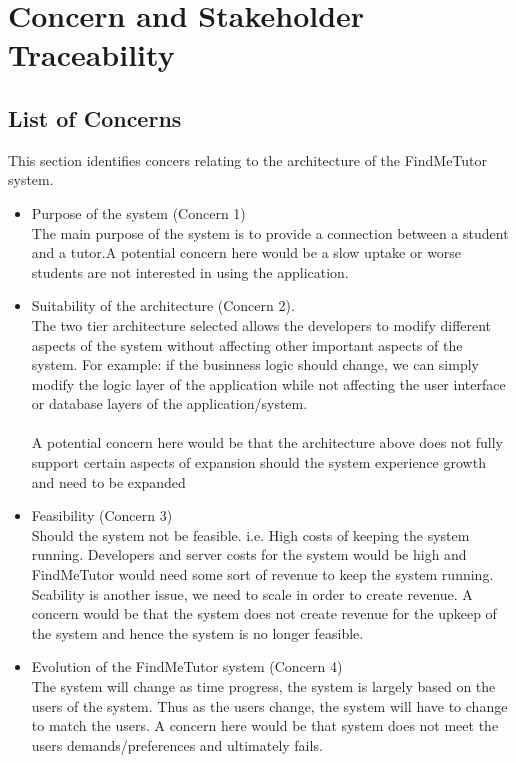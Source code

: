 \documentclass[12pt]{article}
\begin{document}
\pagebreak

\section{Concern and Stakeholder Traceability}
\subsection{List of Concerns}
This section identifies concers relating to the architecture of the FindMeTutor system.
\begin{itemize}
\item{Purpose of the system (Concern 1)}\\
The main purpose of the system is to provide a connection between a student and a tutor.A potential concern here would be a slow uptake or worse students are not interested in using the application.

\item Suitability of the architecture (Concern 2).\\
The two tier architecture selected allows the developers to modify different aspects of the system without affecting other important aspects of the system. For example: if the businness logic should change, we can simply modify the logic layer of the application while not affecting the user interface or database layers of the application/system.\\\\A potential concern here would be that the architecture above does not fully support certain aspects of expansion should the system experience growth and need to be expanded

\item Feasibility (Concern 3)\\
Should the system not be feasible. i.e. High costs of keeping the system running. Developers and server costs for the system would be high and FindMeTutor would need some sort of revenue to keep the system running. Scability is another issue, we need to scale in order to create revenue. A concern would be that the system does not create revenue for the upkeep of the system and hence the system is no longer feasible.

\item Evolution of the FindMeTutor system (Concern 4)\\
The system will change as time progress, the system is largely based on the users of the system. Thus as the users change, the system will have to change to match the users. A concern here would be that system does not meet the users demands/preferences and ultimately fails.


\end{itemize}
\end{document}
